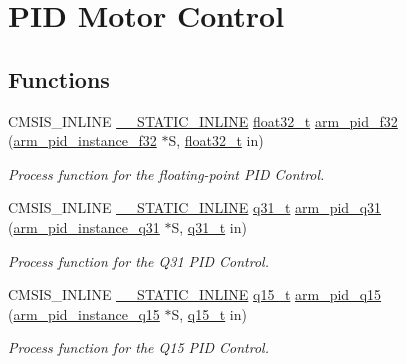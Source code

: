 \hypertarget{group___p_i_d}{}\section{P\+ID Motor Control}
\label{group___p_i_d}
\subsection*{Functions}
\begin{DoxyCompactItemize}
\item 
C\+M\+S\+I\+S\+\_\+\+I\+N\+L\+I\+NE \mbox{\hyperlink{cmsis__iccarm_8h_aba87361bfad2ae52cfe2f40c1a1dbf9c}{\+\_\+\+\_\+\+S\+T\+A\+T\+I\+C\+\_\+\+I\+N\+L\+I\+NE}} \mbox{\hyperlink{arm__math_8h_a4611b605e45ab401f02cab15c5e38715}{float32\+\_\+t}} \mbox{\hyperlink{group___p_i_d_ga9380d08046dd7ec2f5015f569206b9ce}{arm\+\_\+pid\+\_\+f32}} (\mbox{\hyperlink{structarm__pid__instance__f32}{arm\+\_\+pid\+\_\+instance\+\_\+f32}} $\ast$S, \mbox{\hyperlink{arm__math_8h_a4611b605e45ab401f02cab15c5e38715}{float32\+\_\+t}} in)
\begin{DoxyCompactList}\small\item\em Process function for the floating-\/point P\+ID Control. \end{DoxyCompactList}\item 
C\+M\+S\+I\+S\+\_\+\+I\+N\+L\+I\+NE \mbox{\hyperlink{cmsis__iccarm_8h_aba87361bfad2ae52cfe2f40c1a1dbf9c}{\+\_\+\+\_\+\+S\+T\+A\+T\+I\+C\+\_\+\+I\+N\+L\+I\+NE}} \mbox{\hyperlink{arm__math_8h_adc89a3547f5324b7b3b95adec3806bc0}{q31\+\_\+t}} \mbox{\hyperlink{group___p_i_d_ga82bc0813c007d50ce308b9b0bf3c76e2}{arm\+\_\+pid\+\_\+q31}} (\mbox{\hyperlink{structarm__pid__instance__q31}{arm\+\_\+pid\+\_\+instance\+\_\+q31}} $\ast$S, \mbox{\hyperlink{arm__math_8h_adc89a3547f5324b7b3b95adec3806bc0}{q31\+\_\+t}} in)
\begin{DoxyCompactList}\small\item\em Process function for the Q31 P\+ID Control. \end{DoxyCompactList}\item 
C\+M\+S\+I\+S\+\_\+\+I\+N\+L\+I\+NE \mbox{\hyperlink{cmsis__iccarm_8h_aba87361bfad2ae52cfe2f40c1a1dbf9c}{\+\_\+\+\_\+\+S\+T\+A\+T\+I\+C\+\_\+\+I\+N\+L\+I\+NE}} \mbox{\hyperlink{arm__math_8h_ab5a8fb21a5b3b983d5f54f31614052ea}{q15\+\_\+t}} \mbox{\hyperlink{group___p_i_d_gad466471a6b0f8fc570b8b8fc34ac79fa}{arm\+\_\+pid\+\_\+q15}} (\mbox{\hyperlink{structarm__pid__instance__q15}{arm\+\_\+pid\+\_\+instance\+\_\+q15}} $\ast$S, \mbox{\hyperlink{arm__math_8h_ab5a8fb21a5b3b983d5f54f31614052ea}{q15\+\_\+t}} in)
\begin{DoxyCompactList}\small\item\em Process function for the Q15 P\+ID Control. \end{DoxyCompactList}\end{DoxyCompactItemize}


